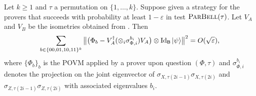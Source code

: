 \documentclass{toc}
\newcommand{\ket}[1]{|#1\rangle}
\newcommand{\Id}{\ensuremath{\mathop{\rm Id}\nolimits}}
\newcommand{\reg}[1]{{\textsf{#1}}}
\newcommand{\eps}{\varepsilon}
\newcommand{\pbellt}{\textsc{ParBell}}
\begin{document}
\begin{lemma}\label{lem:perm-test}
Let $k\geq 1$ and $\tau$ a permutation on $\{1,\ldots,k\}$. Suppose given a strategy for the provers that succeeds with probability at least $1-\eps$ in test $\pbellt(\tau)$. Let $V_A$ and $V_B$ be the isometries obtained from . Then 
$$ \sum_{b\in\{00,01,10,11\}^k} \big\|\big(\Phi_b - V_A^\dagger (\otimes_i \sigma_{\Phi,i}^{b_i} ) V_A\big)\otimes \Id_{\reg{B}}\ket{\psi} \big\|^2 = O(\sqrt{\eps}),$$
where $\{\Phi_b\}_b$ is the POVM applied by a prover upon question $(\Phi,\tau)$ and $\sigma_{\Phi,i}^{b_i}$ denotes the projection on the joint eigenvector of $\sigma_{X,\tau(2i-1)}\sigma_{X,\tau(2i)}$ and $\sigma_{Z,\tau(2i-1)}\sigma_{Z,\tau(2i)}$ with associated eigenvalues $b_i$. 
\end{lemma}
\end{document}
